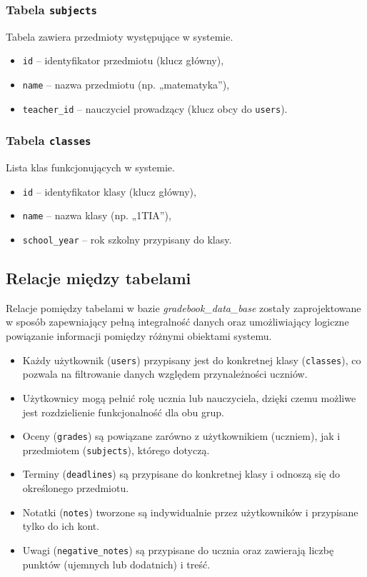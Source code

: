 \subsubsection*{Tabela \texttt{subjects}}

Tabela zawiera przedmioty występujące w systemie.

\begin{itemize}
    \item \texttt{id} – identyfikator przedmiotu (klucz główny),
    \item \texttt{name} – nazwa przedmiotu (np. „matematyka”),
    \item \texttt{teacher\_id} – nauczyciel prowadzący (klucz obcy do \texttt{users}).
\end{itemize}

\subsubsection*{Tabela \texttt{classes}}

Lista klas funkcjonujących w systemie.

\begin{itemize}
    \item \texttt{id} – identyfikator klasy (klucz główny),
    \item \texttt{name} – nazwa klasy (np. „1TIA”),
    \item \texttt{school\_year} – rok szkolny przypisany do klasy.
\end{itemize}


\subsection{Relacje między tabelami}

Relacje pomiędzy tabelami w bazie \textit{gradebook\_data\_base} zostały zaprojektowane w sposób zapewniający pełną integralność danych oraz umożliwiający logiczne powiązanie informacji pomiędzy różnymi obiektami systemu.

\begin{itemize}
     \item Każdy użytkownik (\texttt{users}) przypisany jest do konkretnej klasy (\texttt{classes}), co pozwala na filtrowanie danych względem przynależności uczniów. 
     \item Użytkownicy mogą pełnić rolę ucznia lub nauczyciela, dzięki czemu możliwe jest rozdzielienie funkcjonalność dla obu grup. 
     \item Oceny (\texttt{grades}) są powiązane zarówno z użytkownikiem (uczniem), jak i przedmiotem (\texttt{subjects}), którego dotyczą.      \item Terminy (\texttt{deadlines}) są przypisane do konkretnej klasy i odnoszą się do określonego przedmiotu. \item Notatki (\texttt{notes}) tworzone są indywidualnie przez użytkowników i przypisane tylko do ich kont. 
     \item Uwagi (\texttt{negative\_notes}) są przypisane do ucznia oraz zawierają liczbę punktów (ujemnych lub dodatnich) i treść. 
\end{itemize}

